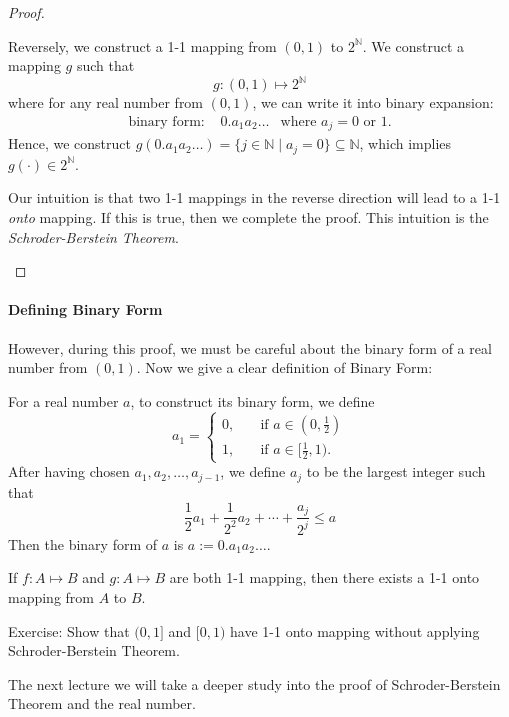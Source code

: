 \begin{proof}
\begin{enumerate}
Reversely, we construct a 1-1 mapping from $(0,1)$ to $2^{\mathbb{N}}$. We construct a mapping $g$ such that
\[
g:(0,1)\mapsto2^{\mathbb{N}}
\]
where for any real number from $(0,1)$, we can write it into binary expansion:
\[
\begin{array}{lll}
\mbox{binary form: }
&
0.a_1a_2\dots
&
\mbox{where }a_j=0\mbox{ or }1.
\end{array}
\]
Hence, we construct $g(0.a_1a_2\dots) = \{j\in\mathbb{N}\mid a_j=0\}\subseteq\mathbb{N}$, which implies $g(\cdot)\in2^{\mathbb{N}}$.
\begin{remark}
Our intuition is that two 1-1 mappings in the reverse direction will lead to a 1-1 \emph{onto} mapping. If this is true, then we complete the proof. This intuition is the \emph{Schroder-Berstein Theorem}.
\end{remark}
\end{enumerate}
\end{proof}
\paragraph{Defining Binary Form} However, during this proof, we must be careful about the binary form of a real number from $(0,1)$. Now we give a clear definition of Binary Form:

For a real number $a$, to construct its binary form, we define
\[
a_1=\left\{
\begin{aligned}
0,&\quad\mbox{if }a\in(0,\frac{1}{2})\\
1,&\quad\mbox{if }a\in[\frac{1}{2},1).
\end{aligned}
\right.
\]
After having chosen $a_1,a_2,\dots,a_{j-1}$, we define $a_j$ to be the largest integer such that
\[
\frac{1}{2}a_1+\frac{1}{2^2}a_2+\cdots+\frac{a_j}{2^j}\le a
\]
Then the binary form of $a$ is $a:=0.a_1a_2\dots$.
\begin{theorem}
If $f:A\mapsto B$ and $g:A\mapsto B$ are both 1-1 mapping, then there exists a 1-1 onto mapping from $A$ to $B$.
\end{theorem}
Exercise: Show that $(0,1]$ and $[0,1)$ have 1-1 onto mapping without applying Schroder-Berstein Theorem.

The next lecture we will take a deeper study into the proof of Schroder-Berstein Theorem and the real number.













